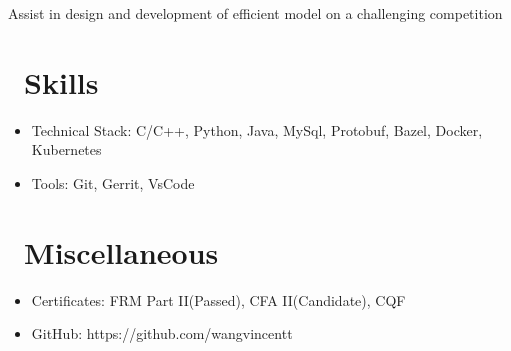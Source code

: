 \documentclass{resume}
\begin{document}
Assist in design and development of efficient model on a challenging competition


\section{\faCogs\ Skills}
\begin{itemize}[parsep=0.5ex]
  \item Technical Stack: C/C++, Python, Java, MySql, Protobuf, Bazel, Docker, Kubernetes
  \item Tools: Git, Gerrit, VsCode
\end{itemize}

\section{\faInfo\ Miscellaneous}
\begin{itemize}[parsep=0.5ex]
  \item Certificates: FRM Part II(Passed), CFA II(Candidate), CQF
  \item GitHub: https://github.com/wangvincentt
\end{itemize}

%
%
\end{document}
